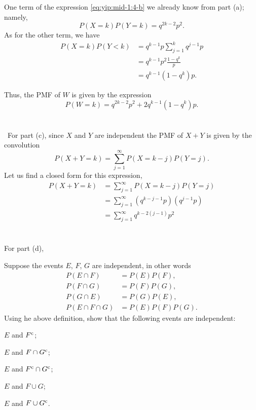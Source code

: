 \begin{solution*}
  One term of the expression \eqref{eq:yip:mid-1:4-b} we already know from
  part (a); namely,
  \[
    P(X=k)P(Y=k)=q^{2k-2}p^2.
  \]
  As for the other term, we have
  \begin{align*}
    P(X=k)P(Y<k)
    &=q^{k-1}p\sum_{j=1}^k q^{j-1}p\\
    &=q^{k-1}p^2\frac{1-q^k}{p}\\
    &=q^{k-1}(1-q^k)p.
  \end{align*}

  Thus, the PMF of \(W\) is given by the expression
  \[
    P(W=k)=q^{2k-2}p^2+2q^{k-1}(1-q^k)p.
  \]
  \\\\\
  For part (c), since \(X\) and \(Y\) are independent the PMF of \(X+Y\) is
  given by the convolution
  \[
    P(X+Y=k)=\sum_{j=1}^\infty P(X=k-j)P(Y=j).
  \]
  Let us find a closed form for this expression,
  \begin{align*}
    P(X+Y=k)
    &=\sum_{j=1}^\infty P(X=k-j) P(Y=j)\\
    &=\sum_{j=1}^\infty (q^{k-j-1}p) (q^{j-1}p)\\
    &=\sum_{j=1}^\infty q^{k-2(j-1)} p^2
  \end{align*}
  \\\\
  For part (d),
\end{solution*}

\begin{problem}
  Suppose the events \(E\), \(F\), \(G\) are independent, in other words
  \begin{align*}
    P(E\cap F)&=P(E)P(F),\\
    P(F\cap G)&=P(F)P(G),\\
    P(G\cap E)&=P(G)P(E),\\
    P(E\cap F\cap G)&=P(E)P(F)P(G).
  \end{align*}
  Using he above definition, show that the following events are
  independent:
  \begin{alphlist}
  \item \(E\) and \(F^{\mathrm{c}}\);
  \item \(E\) and \(F\cap G^{\mathrm{c}}\);
  \item \(E\) and \(F^{\mathrm{c}}\cap G^{\mathrm{c}}\);
  \item \(E\) and \(F\cup G\);
  \item \(E\) and \(F\cup G^{\mathrm{c}}\).
  \end{alphlist}
\end{problem}
\begin{solution*}
\end{solution*}

